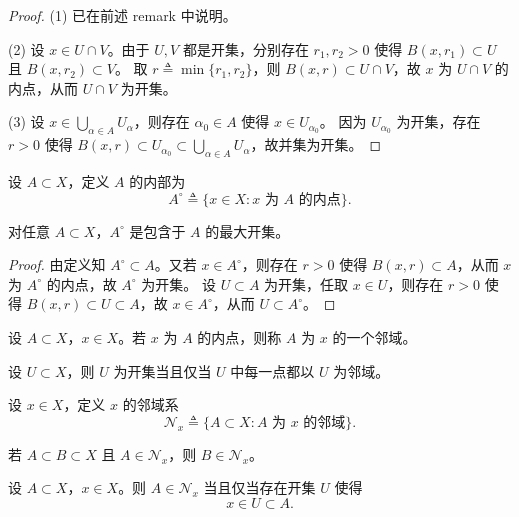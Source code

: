 \documentclass[lang=cn,a4paper,newtx,section]{elegantbook}
\begin{document}
\begin{proof}
  (1) 已在前述 remark 中说明。
  
  (2) 设 $x\in U\cap V$。由于 $U,V$ 都是开集，分别存在 $r_1,r_2>0$ 使得 $B(x,r_1)\subset U$ 且 $B(x,r_2)\subset V$。
  取 $r\triangleq\min\{r_1,r_2\}$，则 $B(x,r)\subset U\cap V$，故 $x$ 为 $U\cap V$ 的内点，从而 $U\cap V$ 为开集。
  
  (3) 设 $x\in\bigcup_{\alpha\in A}U_\alpha$，则存在 $\alpha_0\in A$ 使得 $x\in U_{\alpha_0}$。
  因为 $U_{\alpha_0}$ 为开集，存在 $r>0$ 使得 $B(x,r)\subset U_{\alpha_0}\subset\bigcup_{\alpha\in A}U_\alpha$，故并集为开集。
\end{proof}

\begin{definition}
  设 $A\subset X$，定义 $A$ 的内部为
  \[
    A^\circ\triangleq \{x\in X: x \text{ 为 } A \text{ 的内点}\}.
  \]
\end{definition}

\begin{proposition}
  对任意 $A\subset X$，$A^\circ$ 是包含于 $A$ 的最大开集。
\end{proposition}

\begin{proof}
  由定义知 $A^\circ\subset A$。又若 $x\in A^\circ$，则存在 $r>0$ 使得 $B(x,r)\subset A$，从而 $x$ 为 $A^\circ$ 的内点，故 $A^\circ$ 为开集。
  设 $U\subset A$ 为开集，任取 $x\in U$，则存在 $r>0$ 使得 $B(x,r)\subset U\subset A$，故 $x\in A^\circ$，从而 $U\subset A^\circ$。
\end{proof}

\begin{definition}
  设 $A\subset X$，$x\in X$。若 $x$ 为 $A$ 的内点，则称 $A$ 为 $x$ 的一个邻域。
\end{definition}

\begin{remark}
  设 $U\subset X$，则 $U$ 为开集当且仅当 $U$ 中每一点都以 $U$ 为邻域。
\end{remark}

\begin{definition}
  设 $x\in X$，定义 $x$ 的邻域系
  \[
    \mathcal{N}_x\triangleq \{A\subset X: A \text{ 为 } x \text{ 的邻域}\}.
  \]
\end{definition}

\begin{remark}
  若 $A\subset B\subset X$ 且 $A\in\mathcal{N}_x$，则 $B\in\mathcal{N}_x$。
\end{remark}

\begin{proposition}\label{prop:neighborhood-open-characterization}
  设 $A\subset X$，$x\in X$。则 $A\in\mathcal{N}_x$ 当且仅当存在开集 $U$ 使得
  \[
    x\in U\subset A.
  \]
\end{proposition}
\end{document}
